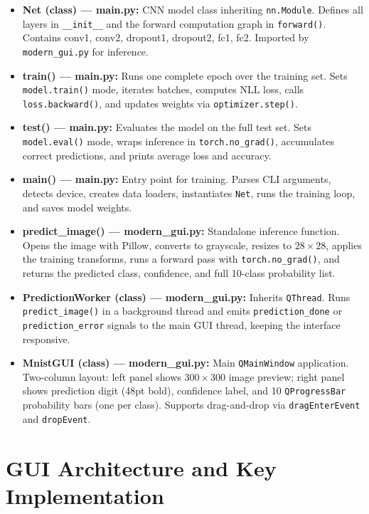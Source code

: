 \documentclass[12pt,a4paper,openany]{report}
\begin{document}
\begin{itemize}
    \item \textbf{Net (class) --- main.py:} CNN model class inheriting \texttt{nn.Module}. Defines all layers in \texttt{\_\_init\_\_} and the forward computation graph in \texttt{forward()}. Contains conv1, conv2, dropout1, dropout2, fc1, fc2. Imported by \texttt{modern\_gui.py} for inference.
    \item \textbf{train() --- main.py:} Runs one complete epoch over the training set. Sets \texttt{model.train()} mode, iterates batches, computes NLL loss, calls \texttt{loss.backward()}, and updates weights via \texttt{optimizer.step()}.
    \item \textbf{test() --- main.py:} Evaluates the model on the full test set. Sets \texttt{model.eval()} mode, wraps inference in \texttt{torch.no\_grad()}, accumulates correct predictions, and prints average loss and accuracy.
    \item \textbf{main() --- main.py:} Entry point for training. Parses CLI arguments, detects device, creates data loaders, instantiates \texttt{Net}, runs the training loop, and saves model weights.
    \item \textbf{predict\_image() --- modern\_gui.py:} Standalone inference function. Opens the image with Pillow, converts to grayscale, resizes to $28 \times 28$, applies the training transforms, runs a forward pass with \texttt{torch.no\_grad()}, and returns the predicted class, confidence, and full 10-class probability list.
    \item \textbf{PredictionWorker (class) --- modern\_gui.py:} Inherits \texttt{QThread}. Runs \texttt{predict\_image()} in a background thread and emits \texttt{prediction\_done} or \texttt{prediction\_error} signals to the main GUI thread, keeping the interface responsive.
    \item \textbf{MnistGUI (class) --- modern\_gui.py:} Main \texttt{QMainWindow} application. Two-column layout: left panel shows $300 \times 300$ image preview; right panel shows prediction digit (48pt bold), confidence label, and 10 \texttt{QProgressBar} probability bars (one per class). Supports drag-and-drop via \texttt{dragEnterEvent} and \texttt{dropEvent}.
\end{itemize}

\section{GUI Architecture and Key Implementation}
\end{document}
